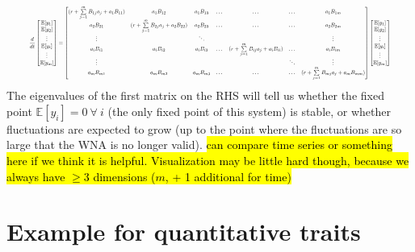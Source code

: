\begin{equation}
\resizebox{0.93\textwidth}{!}{$\displaystyle
	\frac{d}{dt}\begin{bmatrix}
	\mathbb{E}[y_1]\\
	\mathbb{E}[y_2]\\
	\vdots\\
	\mathbb{E}[y_i]\\
	\vdots\\
	\mathbb{E}[y_m]
	\end{bmatrix}
	=
	\begin{bmatrix}
	(r + \sum\limits_{j=1}^{m}B_{1j}a_j + a_1B_{11}) & a_1B_{12} & a_1B_{13} & \dots & \dots & \dots & a_1B_{1m}\\
	a_2B_{21} & (r + \sum\limits_{j=1}^{m}B_{2j}a_j + a_2B_{22}) & a_2B_{23} & \dots & \dots & \dots & a_2B_{2m}\\
	\vdots &  & \ddots & &  & & \vdots\\
	a_{i}B_{i1} & a_iB_{i2} & a_iB_{i3} & \dots & (r + \sum\limits_{j=1}^{m}B_{ij}a_j + a_iB_{ii}) & \dots & a_iB_{im}\\
	\vdots &  &  & & & \ddots & \vdots\\
	a_mB_{m1} & a_mB_{m2} & a_mB_{m3} & \dots & \dots & \dots & (r + \sum\limits_{j=1}^{m}B_{mj}a_j + a_mB_{mm})
	\end{bmatrix}
	\begin{bmatrix}
	\mathbb{E}[y_1]\\
	\mathbb{E}[y_2]\\
	\vdots\\
	\mathbb{E}[y_i]\\
	\vdots\\
	\mathbb{E}[y_m]
	\end{bmatrix}
	$}
\end{equation}
The eigenvalues of the first matrix on the RHS will tell us whether the fixed point $\mathbb{E}[y_i] = 0 \ \forall \ i$ (the only fixed point of this system) is stable, or whether fluctuations are expected to grow (up to the point where the fluctuations are so large that the WNA is no longer valid).
\hl{can compare time series or something here if we think it is helpful. Visualization may be little hard though, because we always have $\geq 3$ dimensions ($m$, + 1 additional for time)}

\section{Example for quantitative traits}

